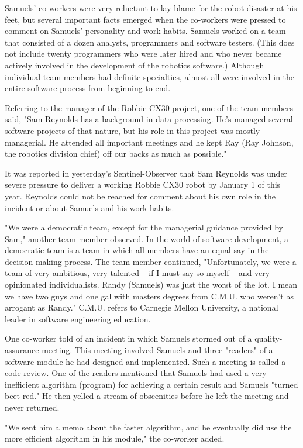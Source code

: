 Samuels' co-workers were very reluctant to lay blame for the robot disaster at his feet, but several important facts emerged when the co-workers were pressed to comment on Samuels' personality and work habits. Samuels worked on a team that consisted of a dozen analysts, programmers and software testers. (This does not include twenty programmers who were later hired and who never became actively involved in the development of the robotics software.) Although individual team members had definite specialties, almost all were involved in the entire software process from beginning to end.

Referring to the manager of the Robbie CX30 project, one of the team members said, "Sam Reynolds has a background in data processing. He's managed several software projects of that nature, but his role in this project was mostly managerial. He attended all important meetings and he kept Ray (Ray Johnson, the robotics division chief) off our backs as much as possible."

It was reported in yesterday's Sentinel-Observer that Sam Reynolds was under severe pressure to deliver a working Robbie CX30 robot by January 1 of this year. Reynolds could not be reached for comment about his own role in the incident or about Samuels and his work habits.

"We were a democratic team, except for the managerial guidance provided by Sam," another team member observed. In the world of software development, a democratic team is a team in which all members have an equal say in the decision-making process. The team member continued, "Unfortunately, we were a team of very ambitious, very talented -- if I must say so myself -- and very opinionated individualists. Randy (Samuels) was just the worst of the lot. I mean we have two guys and one gal with masters degrees from C.M.U. who weren't as arrogant as Randy." C.M.U. refers to Carnegie Mellon University, a national leader in software engineering education.

One co-worker told of an incident in which Samuels stormed out of a quality-assurance meeting. This meeting involved Samuels and three "readers" of a software module he had designed and implemented. Such a meeting is called a code review. One of the readers mentioned that Samuels had used a very inefficient algorithm (program) for achieving a certain result and Samuels "turned beet red." He then yelled a stream of obscenities before he left the meeting and never returned.

"We sent him a memo about the faster algorithm, and he eventually did use the more efficient algorithm in his module," the co-worker added.


